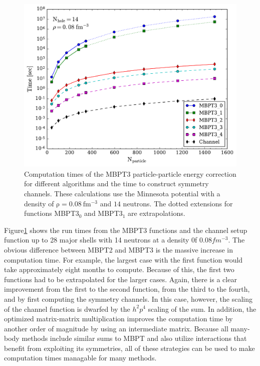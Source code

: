 \begin{figure}
  \includegraphics[width=\linewidth]{Chapter8-figures/MBPT3fig.pdf}
  \caption{Computation times of the MBPT3 particle-particle energy correction for different algorithms and the time to construct symmetry channels. These calculations use the Minnesota potential with a density of $\mathrm{\rho=0.08\ fm^{-3}}$ and $\mathrm{14}$ neutrons. The dotted extensions for functions MBPT3$_0$ and MBPT3$_1$ are extrapolations.}
  \label{fig:fig6}
\end{figure}

Figure\ref{fig:fig6} shows the run times from the MBPT3 functions and the channel setup function up to 28 major shells with 14 neutrons at a density 0f $0.08 fm^{-3}$. The obvious difference between MBPT2 and MBPT3 is the massive increase in computation time. For example, the largest case with the first function would take approximately eight months to compute. Because of this, the first two functions had to be extrapolated for the larger cases. Again, there is a clear improvement from the first to the second function, from the third to the fourth, and by first computing the symmetry channels. In this case, however, the scaling of the channel function is dwarfed by the $h^2p^4$ scaling of the sum. In addition, the optimized matrix-matrix multiplication improves the computation time by another order of magnitude by using an intermediate matrix. Because all many-body methods include similar sums to MBPT and also utilize interactions that benefit from exploiting its symmetries, all of these strategies can be used to make computation times managable for many methods.

